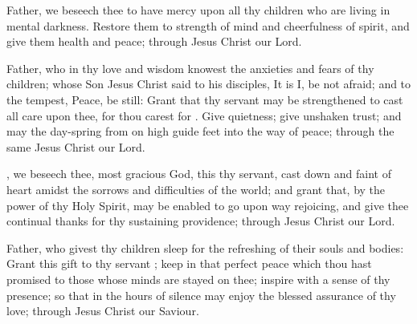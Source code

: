  Father, we beseech thee to have mercy upon all thy children who are living in mental darkness. Restore them to strength of mind and cheerfulness of spirit, and give them health and peace; through Jesus Christ our Lord.

 Father, who in thy love and wisdom knowest the anxieties and fears of thy children; whose Son Jesus Christ said to his disciples, It is I, be not afraid; and to the tempest, Peace, be still: Grant that thy servant  may be strengthened to cast all  care upon thee, for thou carest for . Give  quietness; give  unshaken trust; and may the day-spring from on high guide  feet into the way of peace; through the same Jesus Christ our Lord.

, we beseech thee, most gracious God, this thy servant, cast down and faint of heart amidst the sorrows and difficulties of the world; and grant that, by the power of thy Holy Spirit,  may be enabled to go upon  way rejoicing, and give thee continual thanks for thy sustaining providence; through Jesus Christ our Lord.

 Father, who givest thy children sleep for the refreshing of their souls and bodies: Grant this gift to thy servant ; keep  in that perfect peace which thou hast promised to those whose minds are stayed on thee; inspire  with a sense of thy presence; so that in the hours of silence  may enjoy the blessed assurance of thy love; through Jesus Christ our Saviour.

